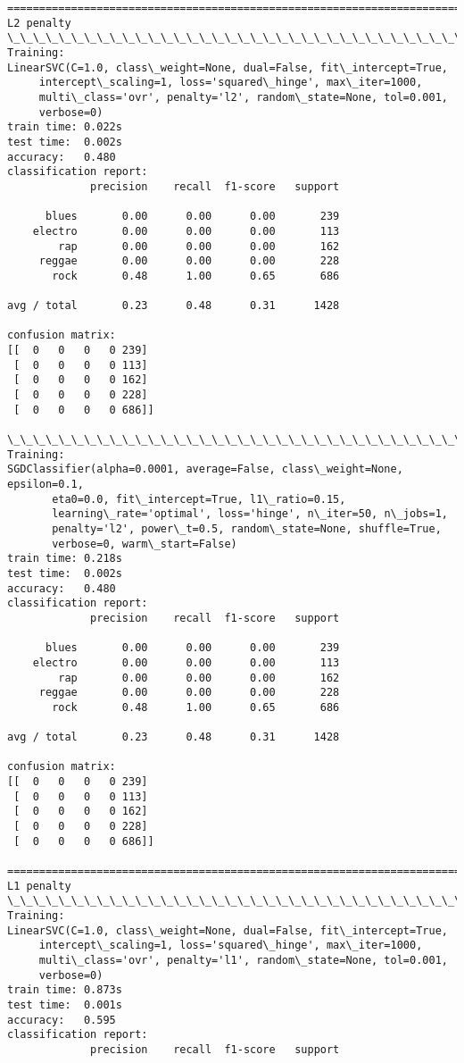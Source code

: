 \documentclass[11pt]{article}
\begin{document}
    \begin{Verbatim}[commandchars=\\\{\}]
================================================================================
L2 penalty
\_\_\_\_\_\_\_\_\_\_\_\_\_\_\_\_\_\_\_\_\_\_\_\_\_\_\_\_\_\_\_\_\_\_\_\_\_\_\_\_\_\_\_\_\_\_\_\_\_\_\_\_\_\_\_\_\_\_\_\_\_\_\_\_\_\_\_\_\_\_\_\_\_\_\_\_\_\_\_\_
Training: 
LinearSVC(C=1.0, class\_weight=None, dual=False, fit\_intercept=True,
     intercept\_scaling=1, loss='squared\_hinge', max\_iter=1000,
     multi\_class='ovr', penalty='l2', random\_state=None, tol=0.001,
     verbose=0)
train time: 0.022s
test time:  0.002s
accuracy:   0.480
classification report:
             precision    recall  f1-score   support

      blues       0.00      0.00      0.00       239
    electro       0.00      0.00      0.00       113
        rap       0.00      0.00      0.00       162
     reggae       0.00      0.00      0.00       228
       rock       0.48      1.00      0.65       686

avg / total       0.23      0.48      0.31      1428

confusion matrix:
[[  0   0   0   0 239]
 [  0   0   0   0 113]
 [  0   0   0   0 162]
 [  0   0   0   0 228]
 [  0   0   0   0 686]]

\_\_\_\_\_\_\_\_\_\_\_\_\_\_\_\_\_\_\_\_\_\_\_\_\_\_\_\_\_\_\_\_\_\_\_\_\_\_\_\_\_\_\_\_\_\_\_\_\_\_\_\_\_\_\_\_\_\_\_\_\_\_\_\_\_\_\_\_\_\_\_\_\_\_\_\_\_\_\_\_
Training: 
SGDClassifier(alpha=0.0001, average=False, class\_weight=None, epsilon=0.1,
       eta0=0.0, fit\_intercept=True, l1\_ratio=0.15,
       learning\_rate='optimal', loss='hinge', n\_iter=50, n\_jobs=1,
       penalty='l2', power\_t=0.5, random\_state=None, shuffle=True,
       verbose=0, warm\_start=False)
train time: 0.218s
test time:  0.002s
accuracy:   0.480
classification report:
             precision    recall  f1-score   support

      blues       0.00      0.00      0.00       239
    electro       0.00      0.00      0.00       113
        rap       0.00      0.00      0.00       162
     reggae       0.00      0.00      0.00       228
       rock       0.48      1.00      0.65       686

avg / total       0.23      0.48      0.31      1428

confusion matrix:
[[  0   0   0   0 239]
 [  0   0   0   0 113]
 [  0   0   0   0 162]
 [  0   0   0   0 228]
 [  0   0   0   0 686]]

================================================================================
L1 penalty
\_\_\_\_\_\_\_\_\_\_\_\_\_\_\_\_\_\_\_\_\_\_\_\_\_\_\_\_\_\_\_\_\_\_\_\_\_\_\_\_\_\_\_\_\_\_\_\_\_\_\_\_\_\_\_\_\_\_\_\_\_\_\_\_\_\_\_\_\_\_\_\_\_\_\_\_\_\_\_\_
Training: 
LinearSVC(C=1.0, class\_weight=None, dual=False, fit\_intercept=True,
     intercept\_scaling=1, loss='squared\_hinge', max\_iter=1000,
     multi\_class='ovr', penalty='l1', random\_state=None, tol=0.001,
     verbose=0)
train time: 0.873s
test time:  0.001s
accuracy:   0.595
classification report:
             precision    recall  f1-score   support


\end{Verbatim}
\end{document}

